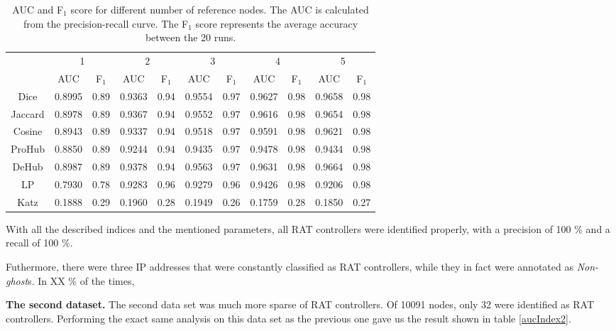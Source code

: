 \begin{table}[h!]
    \centering
    \caption{AUC and F$_1$ score for different number of reference nodes. The AUC is calculated from the precision-recall curve. The F$_1$ score represents the average accuracy between the 20 runs.}
    \begin{tabular}{|c||c|c||c|c||c|c||c|c||c|c||}
      \hline
      \multirow{2}{*}{~} 
            & \multicolumn{2}{c||}{1}
            & \multicolumn{2}{c||}{2}
            & \multicolumn{2}{c||}{3}
            & \multicolumn{2}{c||}{4}
            & \multicolumn{2}{|c|}{5} \\             \cline{2-11}
      ~     &AUC&F$_1$&AUC&F$_1$&AUC&F$_1$&AUC&F$_1$&AUC&F$_1$ \\ \hline
    Dice    &0.8995 & 0.89 & 0.9363 &0.94 &0.9554&0.97 & 0.9627 &0.98&0.9658 & 0.98 \\
    Jaccard &0.8978 & 0.89 & 0.9367 &0.94 &0.9552&0.97 & 0.9616 &0.98&0.9654 & 0.98 \\
    Cosine  &0.8943 & 0.89 & 0.9337 &0.94 &0.9518&0.97 & 0.9591 &0.98&0.9621 & 0.98 \\
    ProHub  &0.8850 & 0.89 & 0.9244 &0.94 &0.9435&0.97 & 0.9478 &0.98&0.9434 & 0.98 \\
    DeHub   &0.8987 & 0.89 & 0.9378 &0.94 &0.9563&0.97 & 0.9631 &0.98&0.9664 & 0.98 \\
    LP      & 0.7930 & 0.78 & 0.9283 & 0.96 & 0.9279 & 0.96 & 0.9426 & 0.98 & 0.9206 & 0.98 \\ 
    Katz    & 0.1888 & 0.29 & 0.1960 & 0.28 & 0.1949 & 0.26 & 0.1759 & 0.28 & 0.1850 & 0.27 \\ \hline
    \end{tabular}
    \label{aucIndex}
\end{table}


With all the described indices and the mentioned parameters, all RAT controllers were identified properly, with a precision of 100 \% and a recall of 100 \%.

Futhermore, there were three IP addresses that were constantly classified as RAT controllers, while they in fact were annotated as \textit{Non-ghost}s. In XX \% of the times, 

    
\textbf{The second dataset.} The second data set was much more sparse of RAT controllers. Of 10091 nodes, only 32 were identified as RAT controllers. Performing the exact same analysis on this data set as the previous one gave us the result shown in table \ref{aucIndex2}.

